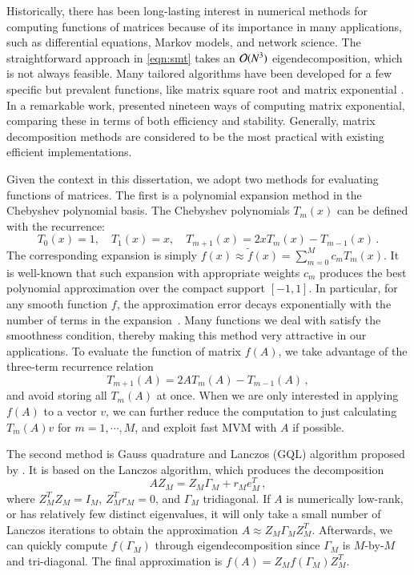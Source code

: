 Historically, there has been long\hyp{}lasting interest in numerical methods for
computing functions of matrices because of its importance in many applications,
such as differential equations, Markov models, and network science. The
straightforward approach in \cref{eqn:smt} takes an $\mathcal{O}(N^3)$
eigendecomposition, which is not always feasible. Many tailored algorithms
have been developed for a few specific but prevalent functions, like matrix
square root and matrix exponential \cite[Chapter 6 \& 10]{higham2008functions}.
In a remarkable work, \citet{moler2003nineteen} presented nineteen ways of
computing matrix exponential, comparing these in terms of both efficiency and
stability. Generally, matrix decomposition methods are considered to be the most
practical with existing efficient implementations.

Given the context in this dissertation, we adopt two methods for evaluating
functions of matrices. The first is a polynomial expansion method in the
Chebyshev polynomial basis. The Chebyshev polynomials $T_m(x)$ can be defined
with the recurrence:
\begin{equation}\label{eqn:cheb_3term}
	T_0(x) = 1,\quad T_1(x) = x,\quad T_{m+1}(x) = 2xT_m(x) - T_{m-1}(x)\,.
\end{equation}
The corresponding expansion is simply $f(x) \approx \tilde{f}(x)= \sum_
{m=0}^Mc_mT_m(x)$. It is well\hyp{}known that such expansion with appropriate
weights $c_m$ produces the best polynomial approximation over the compact
support $[-1,1]$. In particular, for any smooth function $f$, the approximation
error decays exponentially with the number of terms in the expansion~\cite{
Trefethen-2013-ATAP}. Many functions we deal with satisfy the smoothness
condition, thereby making this method very attractive in our applications. To
evaluate the function of matrix $f(A)$, we take advantage of the three\hyp{}term
recurrence relation
\begin{equation}\label{eqn:3term_fom}
T_{m+1}(A) = 2AT_m(A)-T_{m-1}(A)\,,
\end{equation}
and avoid storing all $T_m(A)$ at once. When we are only interested in applying
$f(A)$ to a vector $v$, we can further reduce the computation to just
calculating $T_m(A)v$ for $m = 1,\cdots, M$, and exploit fast MVM with $A$ if
possible.

The second method is Gauss quadrature and Lanczos (GQL) algorithm proposed by 
\citet{golub1997matrices}. It is based on the Lanczos algorithm, which produces
the decomposition
\begin{equation}\label{eqn:lan_decomp}
	AZ_M = Z_M\Gamma_M + r_Me_M^T\,,
\end{equation}
where $Z_M^TZ_M = I_M$, $Z_M^Tr_M = 0$, and $\Gamma_M$ tridiagonal. If $A$ is
numerically low\hyp{}rank, or has relatively few distinct eigenvalues, it will
only take a small number of Lanczos iterations to obtain the approximation
$A\approx Z_M\Gamma_MZ_M^T$. Afterwards, we can quickly compute $f(\Gamma_M)$
through eigendecomposition since $\Gamma_M$ is $M$\hyp{}by\hyp{}$M$ and
tri\hyp{}diagonal. The final approximation is $f(A) = Z_Mf(\Gamma_M)Z_M^T$.

